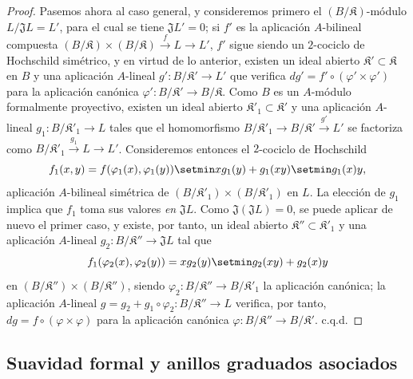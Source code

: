 \begin{proof}
Pasemos ahora al caso general, y consideremos primero el
$(B/\mathfrak K)$-módulo $L/\mathfrak JL=L'$, para el cual se tiene
$\mathfrak JL'=0$; si $f'$ es la aplicación $A$-bilineal compuesta
$(B/\mathfrak K)\times(B/\mathfrak K)\xrightarrow{f}L\to L'$, $f'$ sigue
siendo un $2$-cociclo de Hochschild simétrico, y en virtud de lo anterior,
existen un ideal abierto $\mathfrak K'\subset\mathfrak K$ en $B$ y
una aplicación $A$-lineal $g':B/\mathfrak K'\to L'$ que verifica
$dg'=f'\circ(\varphi'\times\varphi')$ para la aplicación canónica
$\varphi':B/\mathfrak K'\to B/\mathfrak K$. Como $B$ es un
$A$-módulo formalmente proyectivo, existen un ideal abierto
$\mathfrak K'_1\subset\mathfrak K'$ y una aplicación $A$-lineal
$g_1:B/\mathfrak K'_1\to L$ tales que el homomorfismo
$B/\mathfrak K'_1\to B/\mathfrak K'\xrightarrow{g'}L'$ se factoriza como
$B/\mathfrak K'_1\xrightarrow{g_1}L\to L'$. Consideremos entonces el
$2$-cociclo de Hochschild
\[
  f_1(x,y)=f(\varphi_1(x),\varphi_1(y))\setmin xg_1(y)+g_1(xy)\setmin g_1(x)y,
\]
aplicación $A$-bilineal simétrica de
$(B/\mathfrak K'_1)\times(B/\mathfrak K'_1)$ en $L$. La elección de
$g_1$ implica que $f_1$ toma sus valores \emph{en} $\mathfrak JL$. Como
$\mathfrak J(\mathfrak JL)=0$, se puede aplicar de nuevo el primer caso,
y existe, por tanto, un ideal abierto
$\mathfrak K''\subset\mathfrak K'_1$ y una aplicación $A$-lineal
$g_2:B/\mathfrak K''\to\mathfrak JL$ tal que
\[
  f_1(\varphi_2(x),\varphi_2(y))=xg_2(y)\setmin g_2(xy)+g_2(x)y
\]
en $(B/\mathfrak K'')\times(B/\mathfrak K'')$,
siendo $\varphi_2:B/\mathfrak K''\to B/\mathfrak K'_1$ la aplicación
canónica; la aplicación $A$-lineal
$g=g_2+g_1\circ\varphi_2:B/\mathfrak K''\to L$ verifica, por tanto,
$dg=f\circ(\varphi\times\varphi)$ para la aplicación canónica
$\varphi:B/\mathfrak K''\to B/\mathfrak K'$. c.q.d.
\end{proof}


\subsection{Suavidad formal y anillos graduados asociados}
\label{subsection:0.19.5-fr}

